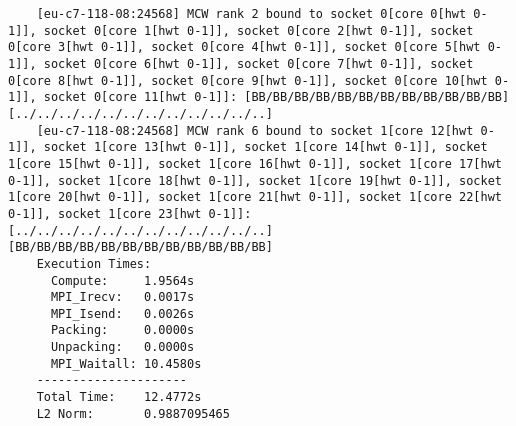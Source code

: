 \documentclass[11pt,a4paper]{article}
\begin{document}
\begin{lstlisting}
	[eu-c7-118-08:24568] MCW rank 2 bound to socket 0[core 0[hwt 0-1]], socket 0[core 1[hwt 0-1]], socket 0[core 2[hwt 0-1]], socket 0[core 3[hwt 0-1]], socket 0[core 4[hwt 0-1]], socket 0[core 5[hwt 0-1]], socket 0[core 6[hwt 0-1]], socket 0[core 7[hwt 0-1]], socket 0[core 8[hwt 0-1]], socket 0[core 9[hwt 0-1]], socket 0[core 10[hwt 0-1]], socket 0[core 11[hwt 0-1]]: [BB/BB/BB/BB/BB/BB/BB/BB/BB/BB/BB/BB][../../../../../../../../../../../..]
	[eu-c7-118-08:24568] MCW rank 6 bound to socket 1[core 12[hwt 0-1]], socket 1[core 13[hwt 0-1]], socket 1[core 14[hwt 0-1]], socket 1[core 15[hwt 0-1]], socket 1[core 16[hwt 0-1]], socket 1[core 17[hwt 0-1]], socket 1[core 18[hwt 0-1]], socket 1[core 19[hwt 0-1]], socket 1[core 20[hwt 0-1]], socket 1[core 21[hwt 0-1]], socket 1[core 22[hwt 0-1]], socket 1[core 23[hwt 0-1]]: [../../../../../../../../../../../..][BB/BB/BB/BB/BB/BB/BB/BB/BB/BB/BB/BB]
	Execution Times:
	  Compute:     1.9564s
	  MPI_Irecv:   0.0017s
	  MPI_Isend:   0.0026s
	  Packing:     0.0000s
	  Unpacking:   0.0000s
	  MPI_Waitall: 10.4580s
	---------------------
	Total Time:    12.4772s
	L2 Norm:       0.9887095465
	
	\end{lstlisting}
	





\end{document}
